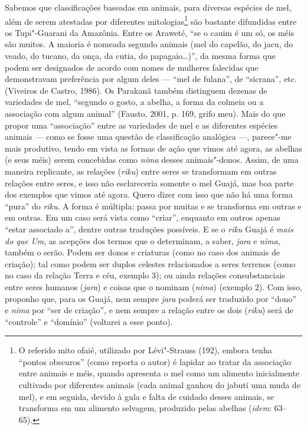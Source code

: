 Sabemos que classificações baseadas em animais, para diversas espécies
de mel, além de serem atestadas por diferentes mitologias\footnote{O
  referido mito ofaié, utilizado por Lévi"-Strauss (192), embora tenha
  ``pontos obscuros'' (como reporta o autor) é lapidar ao tratar da
  associação entre animais e méis, quando apresenta o mel como um
  alimento inicialmente cultivado por diferentes animais (cada animal
  ganhou do jabuti uma muda de mel), e em seguida, devido à gula e falta
  de cuidado desses animais, se transforma em um alimento selvagem,
  produzido pelas abelhas (\emph{idem}: 63--65).} são bastante difundidas entre
os Tupi"-Guarani da Amazônia. Entre os Araweté, ``se o cauim é um só, os
méis são muitos. A maioria é nomeada segundo animais (mel do capelão, do
jacu, do veado, do tucano, da onça, da cutia, do papagaio\ldots{})'', da mesma
forma que podem ser designados de acordo com nomes de mulheres falecidas
que demonstravam preferência por algum deles --- ``mel de fulana'', de
``sicrana'', etc. (Viveiros de Castro, 1986). Os Parakanã também
distinguem dezenas de variedades de mel, ``segundo o gosto, a abelha, a
forma da colmeia ou a associação com algum animal'' (Fausto, 2001, p.
169, grifo meu). Mais do que propor uma ``associação'' entre as variedades
de mel e as diferentes espécies animais --- como se fosse uma questão de
classificação analógica ---, parece"-me mais produtivo, tendo em vista as
formas de ação que vimos até agora, as abelhas (e seus méis) serem
concebidas como \emph{nima} desses animais"-donos. Assim, de uma maneira
replicante, as relações (\emph{riku}) entre seres se transformam em
outras relações entre seres, e isso não esclareceria somente o mel
Guajá, mas boa parte dos exemplos que vimos até agora. Quero dizer com
isso que não há uma forma ``pura'' do \emph{riku}. A forma é múltipla:
passa por muitas e se transforma em outras e em outras. Em um caso será
vista como ``criar'', enquanto em outros apenas ``estar associado a'',
dentre outras traduções possíveis. E se o \emph{riku} Guajá é \emph{mais
do que} \emph{Um}, as acepções dos termos que o determinam, a saber,
\emph{jara} e \emph{nima}, também o serão. Podem ser donos e criaturas
(como no caso dos animais de criação); tal como podem ser duplos
celestes relacionados a seres terrenos (como no caso da relação Terra e
céu, exemplo 3); ou ainda relações consubstanciais entre seres humanos
(\emph{jara}) e coisas que o nominam (\emph{nima}) (exemplo 2). Com
isso, proponho que, para os Guajá, nem sempre \emph{jara} poderá ser
traduzido por ``dono'' e \emph{nima} por ``ser de criação'', e nem sempre a
relação entre os dois (\emph{riku}) será de ``controle'' e ``domínio''
(voltarei a esse ponto).

